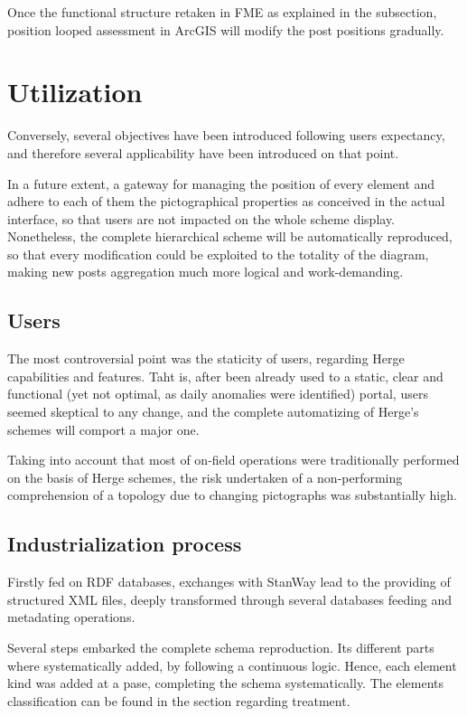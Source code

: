Once the functional structure retaken in FME as explained in the  subsection, position looped assessment in ArcGIS will modify the post positions gradually.

\section{Utilization}

Conversely, several objectives have been introduced following users expectancy, and therefore several applicability have been introduced on that point.

In a future extent, a gateway for managing the position of every element and adhere to each of them the pictographical properties as conceived in the actual interface, so that users are not impacted on the whole scheme display. Nonetheless, the complete hierarchical scheme will be automatically reproduced, so that every modification could be exploited to the totality of the diagram, making new posts aggregation much more logical and work-demanding.

\subsection{Users}

The most controversial point was the staticity of users, regarding Herge capabilities and features. Taht is, after been already used to a static, clear and functional (yet not optimal, as daily anomalies were identified) portal, users seemed skeptical to any change, and the complete automatizing of Herge's schemes will comport a major one.

Taking into account that most of on-field operations were traditionally performed on the basis of Herge schemes, the risk undertaken of a non-performing comprehension of a topology due to changing pictographs was substantially high.

\subsection{Industrialization process}

Firstly fed on RDF databases, exchanges with StanWay lead to the providing of structured XML files, deeply transformed through several databases feeding and metadating operations.

Several steps embarked the complete schema reproduction. Its different parts where systematically added, by following a continuous logic. Hence, each element kind was added at a pase, completing the schema systematically. The elements classification can be found in the section regarding  treatment.

